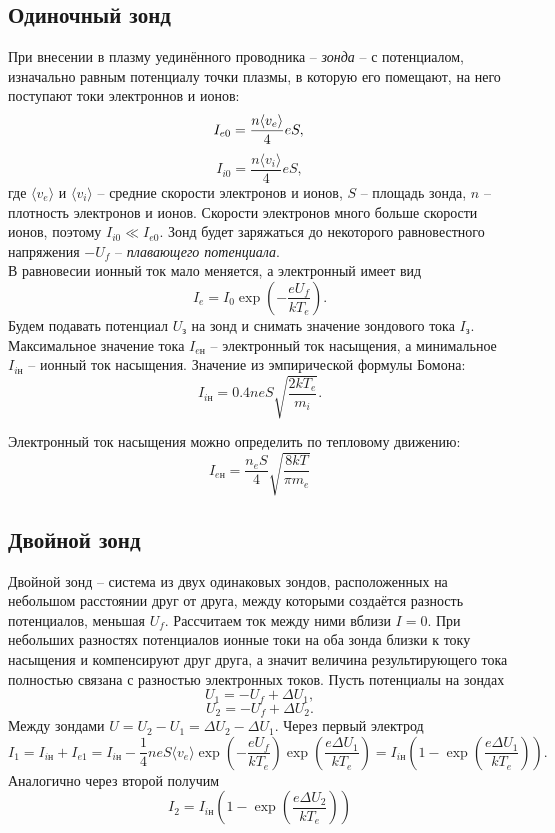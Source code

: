 \subsection*{Одиночный зонд}
При внесении в плазму уединённого проводника -- \textit{зонда} -- с потенциалом, изначально равным потенциалу точки плазмы, в которую его помещают, на него поступают токи электроннов и ионов:
\begin{equation}
        I_{e0} = \dfrac{n \langle v_e \rangle}{4}eS,\\
\end{equation}
\begin{equation}
    I_{i0} = \dfrac{n \langle v_i \rangle}{4}eS,
\end{equation}
где $\langle v_e \rangle$ и $\langle v_i \rangle$ -- средние скорости электронов и ионов, $S$ -- площадь зонда, $n$ -- плотность электронов и ионов. Скорости электронов много больше скорости ионов, поэтому $I_{i0} \ll I_{e0}$. Зонд будет заряжаться до некоторого равновестного напряжения $-U_f$ -- \textit{плавающего потенциала}.\\
В равновесии ионный ток мало меняется, а электронный имеет вид
$$
I_e = I_0 \exp\left( -\dfrac{eU_f}{kT_e} \right).
$$
Будем подавать потенциал $U_\text{з}$ на зонд и снимать значение зондового тока $I_\text{з}$. Максимальное значение тока $I_{e\text{н}}$ -- электронный ток насыщения, а минимальное $I_{i\text{н}}$ -- ионный ток насыщения. Значение из эмпирической формулы Бомона:
\begin{equation}
    I_{i\text{н}} = 0.4 neS \sqrt{\dfrac{2kT_e}{m_i}}.
\end{equation}

Электронный ток насыщения можно определить по тепловому движению:
\[I_{e\text{н}} = \frac{n_eS}{4}\sqrt{\frac{8kT}{\pi m_e}}\]
\subsection*{Двойной зонд}
Двойной зонд -- система из двух одинаковых зондов, расположенных на небольшом расстоянии друг от друга, между которыми создаётся разность потенциалов, меньшая $U_f$. Рассчитаем ток между ними вблизи $I=0$. При небольших разностях потенциалов ионные токи на оба зонда близки к току насыщения и компенсируют друг друга, а значит величина результирующего тока полностью связана с разностью электронных токов. Пусть потенциалы на зондах
$$
U_1 = -U_f + \Delta U_1,
$$
$$
U_2 = -U_f + \Delta U_2.
$$
Между зондами $U = U_2 - U_1 = \Delta U_2 - \Delta U_1$.
Через первый электрод
\begin{equation}
    I_1 = I_{i\text{н}} + I_{e1} = I_{i\text{н}} - \dfrac{1}{4}neS\langle v_e\rangle \exp\left(-\dfrac{eU_f}{kT_e}\right)\exp\left(\dfrac{e\Delta U_1}{kT_e}\right)=I_{i\text{н}}\left(1 - \exp\left( \dfrac{e\Delta U_1}{kT_e} \right)\right).
\end{equation}
Аналогично через второй получим
\begin{equation}
    I_2 = I_{i\text{н}}\left(1 - \exp\left( \dfrac{e\Delta U_2}{kT_e} \right)\right)
\end{equation}

